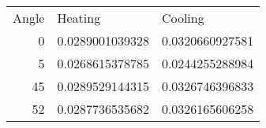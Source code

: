 \begin{tabular}{r | l l}
Angle & Heating & Cooling\\
0 & 0.0289001039328 & 0.0320660927581\\
5 & 0.0268615378785 & 0.0244255288984\\
45 & 0.0289529144315 & 0.0326746396833\\
52 & 0.0287736535682 & 0.0326165606258\\
\end{tabular}
